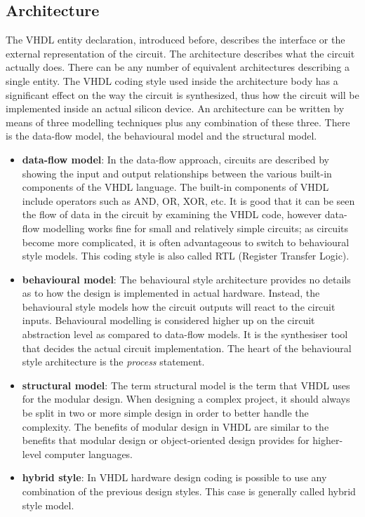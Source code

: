 \subsection{Architecture}
\noindent The VHDL entity declaration, introduced before, describes the interface or the external representation of the circuit. The architecture describes what the circuit actually does.
There can be any number of equivalent architectures describing a single entity. The VHDL coding style used inside
the architecture body has a significant effect on the way the circuit is
synthesized, thus how the circuit will be implemented inside an actual silicon device.
An architecture can be written by means of three modelling techniques
plus any combination of these three. There is the data-flow model, the behavioural model and the structural model.
\begin{itemize}
	\item \textbf{data-flow model}:
	In the data-flow approach, circuits are described by showing the input and output relationships between the various built-in components of the VHDL language. The built-in components of VHDL include operators such as AND, OR, XOR, etc.
	It is good that it can be seen the flow of data in the circuit by examining the VHDL code, however data-flow modelling works fine for small and relatively simple circuits; as circuits become more complicated, it is often advantageous to switch to behavioural style models.
	This coding style is also called RTL (Register Transfer Logic).
	\item \textbf{behavioural model}:
	The behavioural style architecture provides no details as to how the design is implemented in actual hardware.
	Instead, the behavioural style models how the circuit outputs will react to the circuit inputs.
	Behavioural modelling is considered higher up on the circuit abstraction level as compared to data-flow models.
	It is the synthesiser tool that decides the actual circuit implementation.
	The heart of the behavioural style architecture is the \textit{process} statement.	
	\item \textbf{structural model}:
	The term structural model is the term that VHDL uses for the modular design.
	When designing a complex project, it should always be split in two or more simple design in order to better handle the complexity.
	The benefits of modular design in VHDL are similar to the benefits that modular design or object-oriented design provides for higher-level computer languages.
	\item \textbf{hybrid style}:
	In VHDL hardware design coding is possible to use any combination of the previous design styles. This case is generally called hybrid style model.
	
\end{itemize}

